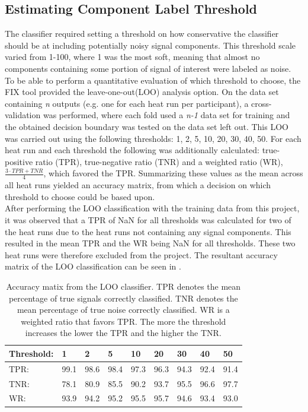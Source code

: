 \subsection{Estimating Component Label Threshold}
The classifier required setting a threshold on how conservative the classifier should be at including potentially noisy signal components. This threshold scale varied from 1-100, where 1 was the most soft, meaning that almost no components containing some portion of signal of interest were labeled as noise. \\
To be able to perform a quantitative evaluation of which threshold to choose, the FIX tool provided the leave-one-out(LOO) analysis option. On the data set containing \textit{n} outputs (e.g. one for each heat run per participant), a cross-validation was performed, where each fold used a \textit{n-1} data set for training and the obtained decision boundary was tested on the data set left out. This LOO was carried out using the following thresholds: 1, 2, 5, 10, 20, 30, 40, 50. For each heat run and each threshold the following was additionally calculated: true-positive ratio (TPR), true-negative ratio (TNR) and a weighted ratio (WR), $\frac{3\cdot TPR+TNR}{4}$, which favored the TPR. Summarizing these values as the mean across all heat runs yielded an accuracy matrix, from which a decision on which threshold to choose could be based upon. \\
After performing the LOO classification with the training data from this project, it was observed that a TPR of NaN for all thresholds was calculated for two of the heat runs due to the heat runs not containing any signal components. This resulted in the mean TPR and the WR being NaN for all thresholds. These two heat runs were therefore excluded from the project. The resultant accuracy matrix of the LOO classification can be seen in .

\begin{table}[H] 
	\caption{Accuracy matix from the LOO classifier. TPR denotes the mean percentage of true signals correctly classified. TNR denotes the mean percentage of true noise correctly classified. WR is a weighted ratio that favors TPR. The more the threshold increases the lower the TPR and the higher the TNR.}\label{tab:decisionmatrix}
	\begin{tabular}{l|llllllll}
		Threshold:                              & 1    & 2    & 5    & 10   & 20   & 30   & 40   & 50   \\ \hline
		TPR:                                    & 99.1 & 98.6 & 98.4 & 97.3 & 96.3 & 94.3 & 92.4 & 91.4 \\ %
		TNR:                                    & 78.1 & 80.9 & 85.5 & 90.2 & 93.7 & 95.5 & 96.6 & 97.7 \\ %
		WR: & 93.9 & 94.2 & 95.2 & 95.5 & 95.7 & 94.6 & 93.4 & 93.0
	\end{tabular}
\end{table}


